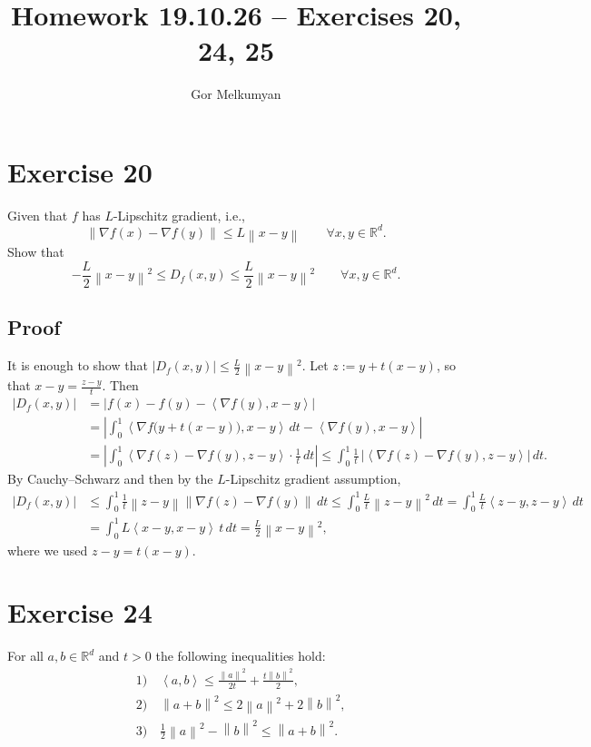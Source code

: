 \documentclass[11pt,a4paper]{article}
\title{Homework 19.10.26 -- Exercises 20, 24, 25}
\author{Gor Melkumyan}
\date{}
\newcommand{\R}{\mathbb{R}}
\newcommand{\norm}[1]{\left\| #1 \right\|}
\newcommand{\ip}[2]{\left\langle #1, #2 \right\rangle}
\begin{document}
\maketitle

\section*{Exercise 20}

Given that $f$ has $L$-Lipschitz gradient, i.e.,
\[
  \norm{\nabla f(x) - \nabla f(y)} \le L\norm{x-y} \qquad \forall x, y \in \R^d .
\]
Show that
\[
  -\frac{L}{2}\norm{x-y}^2 \le D_f(x,y) \le \frac{L}{2}\norm{x-y}^2 \qquad \forall x, y \in \R^d .
\]

\subsection*{Proof}
It is enough to show that $|D_f(x,y)| \le \frac{L}{2}\norm{x-y}^2$.
Let $z := y + t(x-y)$, so that $x - y = \frac{z-y}{t}$. Then
\begin{align*}
  |D_f(x,y)|
  &= \bigl|f(x) - f(y) - \ip{\nabla f(y)}{x-y}\bigr|
  \\
  &= \left|\int_0^1 \ip{\nabla f\bigl(y + t(x-y)\bigr)}{x-y}\,dt - \ip{\nabla f(y)}{x-y}\right| \\
  &= \left|\int_0^1 \ip{\nabla f(z) - \nabla f(y)}{z-y}\cdot\frac{1}{t}\,dt\right|
  \le \int_0^1 \frac{1}{t}\,\bigl|\ip{\nabla f(z) - \nabla f(y)}{z-y}\bigr|\,dt .
\end{align*}
By Cauchy--Schwarz and then by the $L$-Lipschitz gradient assumption,
\begin{align*}
  |D_f(x,y)|
  &\le \int_0^1 \frac{1}{t}\norm{z-y}\norm{\nabla f(z) - \nabla f(y)}\,dt
  \le \int_0^1 \frac{L}{t}\norm{z-y}^2\,dt
  = \int_0^1 \frac{L}{t}\ip{z-y}{z-y}\,dt \\
  &= \int_0^1 L\ip{x-y}{x-y}\,t\,dt
  = \frac{L}{2}\norm{x-y}^2,
\end{align*}
where we used $z - y = t(x-y)$.

\section*{Exercise 24}

For all $a, b \in \R^d$ and $t > 0$ the following inequalities hold:
\begin{align*}
  &1)\quad \ip{a}{b} \le \frac{\norm{a}^2}{2t} + \frac{t\norm{b}^2}{2}, \\
  &2)\quad \norm{a+b}^2 \le 2\norm{a}^2 + 2\norm{b}^2, \\
  &3)\quad \frac{1}{2}\norm{a}^2 - \norm{b}^2 \le \norm{a+b}^2 .
\end{align*}
\end{document}
